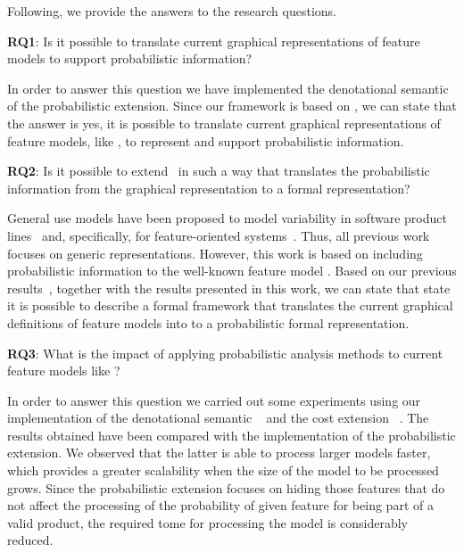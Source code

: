 Following, we provide the answers to the research questions.

\textbf{RQ1}: Is it possible to translate current graphical representations of feature models to
support probabilistic information?


In order to answer this question we have implemented the denotational semantic
of the probabilistic extension. Since our framework is based on \FODA, we
can state that the answer is yes, it is possible to translate current graphical
representations of feature models, like \FODA, to represent and support probabilistic
information.

\textbf{RQ2}: Is it possible to extend \fodaPA\ in such a way that
translates the probabilistic information from the graphical representation to a formal representation?

General use models have been proposed to model variability in software
product lines~\cite{tlll15, tllv15} and, specifically, for feature-oriented
systems~\cite{Dubslaff2015, Chrszon2018}.
Thus, all previous work focuses on
generic representations. However, this work is based on including probabilistic
information to the well-known feature model \FODA.
Based on our previous results~\cite{acl13,clc16}, together with the results
presented in this work, we can state that state it is possible to
describe a formal framework that translates the current graphical
definitions of feature models into to a probabilistic formal representation.

\textbf{RQ3}: What is the impact of applying probabilistic analysis methods
to current feature models like \FODA?

In order to answer this question we carried out some experiments using
our implementation of the denotational semantic \fodaPA~\cite{acl13}
and the cost extension \fodaPAc~\cite{clc16}. The results obtained
have been compared with the implementation of the probabilistic
extension. We observed that the latter is able to process larger
models faster, which provides a greater scalability when
the size of the model to be processed grows. Since the probabilistic extension
focuses on hiding  those features that do not affect the processing of the
probability of given feature for being part of a valid product, the required
tome for processing the model is considerably reduced.



